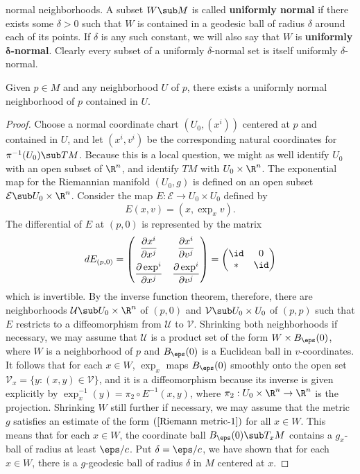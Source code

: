 normal neighborhoods. A subset $W\sub M$ is called \textbf{uniformly normal} if there exists some $\delta>0$ such that $W$ is contained in a geodesic ball of radius 
$\delta$ around each of its points. If $\delta$ is any such constant, we will also say that $W$ is \textbf{uniformly $\bm{\delta}$-normal}. Clearly every subset of a 
uniformly $\delta$-normal set is itself uniformly $\delta$-normal.
\begin{lemma}\label{Riemann uniformly normal neighborhood}
Given $p\in M$ and any neighborhood $U$ of $p$, there exists a uniformly normal neighborhood of $p$ contained in $U$.
\end{lemma}
\begin{proof}
Choose a normal coordinate chart $(U_0,(x^i))$ centered at $p$ and contained in $U$, and let $(x^i,v^i)$ be the corresponding natural coordinates for $\pi^{-1}(U_0)\sub TM$. Because this is a local question, we might as well identify $U_0$ with an open subset of $\R^n$, and identify $TM$ with $U_0\times\R^n$. The exponential map for the Riemannian manifold $(U_0,g)$ is defined on an open subset $\mathcal{E}\sub U_0\times\R^n$. Consider the map $E:\mathcal{E}\to U_0\times U_0$ defined by
\[E(x,v)=(x,\exp_xv).\]
The differential of $E$ at $(p,0)$ is represented by the matrix
\[dE_{(p,0)}=\begin{pmatrix}
\dfrac{\partial x^i}{\partial x^j}&\dfrac{\partial x^i}{\partial v^j}\\[8pt]
\dfrac{\partial\exp^i}{\partial x^j}&\dfrac{\partial\exp^i}{\partial v^j}
\end{pmatrix}=\begin{pmatrix}
\id&0\\
*&\id
\end{pmatrix}\]
which is invertible. By the inverse function theorem, therefore, there are neighborhoods $\mathcal{U}\sub U_0\times\R^n$ of $(p,0)$ and $\mathcal{V}\sub U_0\times U_0$ of $(p,p)$ such that $E$ restricts to a diffeomorphism from $\mathcal{U}$ to $\mathcal{V}$. Shrinking both neighborhoods if necessary, we may assume that $\mathcal{U}$ is a product set of the form $W\times B_\eps(0)$, where $W$ is a neighborhood of $p$ and $B_\eps(0)$ is a Euclidean ball in $v$-coordinates. It follows that for each $x\in W$, $\exp_x$ maps $B_{\eps}(0)$ smoothly onto the open set $\mathcal{V}_x=\{y:(x,y)\in\mathcal{V}\}$, and it is a diffeomorphism because its inverse is given explicitly by $\exp_x^{-1}(y)=\pi_2\circ E^{-1}(x,y)$, where $\pi_2:U_0\times\R^n\to\R^n$ is the projection. Shrinking $W$ still further if necessary, we may assume that the metric $g$ satisfies an estimate of the form $(\ref{Riemann metric-1})$ for all $x\in W$. This means that for each $x\in W$, the coordinate ball $B_\eps(0)\sub T_xM$ contains a $g_x$-ball of radius at least $\eps/c$. Put $\delta=\eps/c$, we have shown that for each $x\in W$, there is a $g$-geodesic ball of radius $\delta$ in $M$ centered at $x$.\par

\end{proof}
